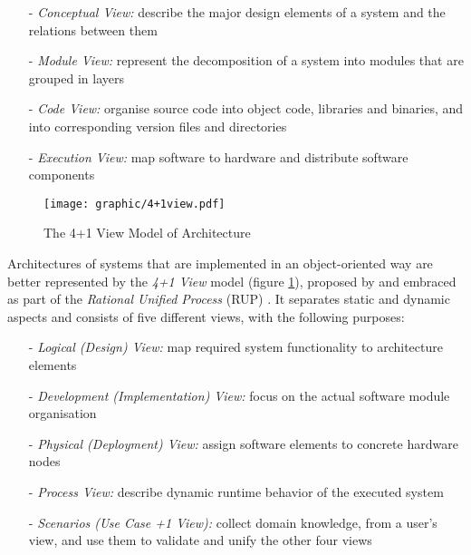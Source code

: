 \begin{itemize}
    \item[-] \emph{Conceptual View:} describe the major design elements of a
        system and the relations between them
    \item[-] \emph{Module View:} represent the decomposition of a system into
        modules that are grouped in layers
    \item[-] \emph{Code View:} organise source code into object code, libraries
        and binaries, and into corresponding version files and directories
    \item[-] \emph{Execution View:} map software to hardware and distribute
        software components
\end{itemize}

\begin{figure}[ht]
    \begin{center}
        \texttt{[image: graphic/4+1view.pdf]}
        \caption{The 4+1 View Model of Architecture \cite{kruchten}}
        \label{4+1view_figure}
    \end{center}
\end{figure}

Architectures of systems that are implemented in an object-oriented way are better
represented by the \emph{4+1 View} model (figure \ref{4+1view_figure}), proposed by
\cite{kruchten} and embraced as part of the \emph{Rational Unified Process} (RUP)
\cite{rup}. It separates static and dynamic aspects and consists of five different
views, with the following purposes:

\begin{itemize}
    \item[-] \emph{Logical (Design) View:} map required system functionality to
        architecture elements
    \item[-] \emph{Development (Implementation) View:} focus on the actual
        software module organisation
    \item[-] \emph{Physical (Deployment) View:} assign software elements to
        concrete hardware nodes
    \item[-] \emph{Process View:} describe dynamic runtime behavior of the
        executed system
    \item[-] \emph{Scenarios (Use Case +1 View):} collect domain knowledge, from
        a user's view, and use them to validate and unify the other four views
\end{itemize}

